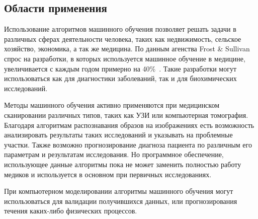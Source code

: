 \subsection{Области применения}
Использование алгоритмов машинного обучения позволяет решать задачи в различных сферах деятельности человека, таких как недвижимость, сельское хозяйство, экономика, а так же медицина. По данным агенства Frost \& Sullivan спрос на разработки, в которых используется машинное обучение в медицине, увеличивается с каждым годом примерно на 40\%~\cite{habrbigdatamedicine}. Такие разработки могут использоваться как для диагностики заболеваний, так  и для биохимических исследований.
\par
Методы машинного обучения активно применяются при медицинском сканировании различных типов, таких как УЗИ или компьютерная томография. Благодаря алгоритмам распознавания образов на изображениях есть возможность анализировать результаты таких исследований и указывать на проблемные участки. Также возможно прогнозирование диагноза пациента по различным его параметрам и результатам исследования. Но программное обеспечение, использующее данные алгоритмы пока не может заменить полностью работу медиков и используется в основном при первичных исследованиях.
\par
При компьютерном моделировании алгоритмы машинного обучения могут использоваться для валидации получившихся данных, или прогнозирования течения каких-либо физических процессов.

